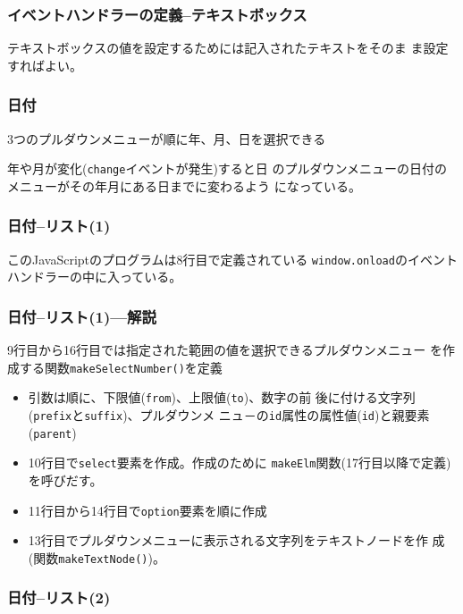 \begin{frame}[containsverbatim]
 \frametitle{イベントハンドラーの定義--テキストボックス}
 テキストボックスの値を設定するためには記入されたテキストをそのま
       ま設定すればよい。
\end{frame}
\begin{frame}[containsverbatim]
\frametitle{日付}
3つのプルダウンメニューが順に年、月、日を選択できる

年や月が変化(\texttt{change}イベントが発生)すると日
 のプルダウンメニューの日付のメニューがその年月にある日までに変わるよう
 になっている。
\end{frame}
\begin{frame}[containsverbatim]
\frametitle{日付--リスト(1)}
 このJavaScriptのプログラムは8行目で定義されている
       \texttt{window.onload}のイベントハンドラーの中に入っている。

\end{frame}
\begin{frame}[containsverbatim]
\frametitle{日付--リスト(1)---解説}
 9行目から16行目では指定された範囲の値を選択できるプルダウンメニュー
       を作成する関数\texttt{makeSelectNumber()}を定義
\begin{itemize}
 \item 引数は順に、下限値(\texttt{from})、上限値(\texttt{to})、数字の前
       後に付ける文字列(\texttt{prefix}と\texttt{suffix})、プルダウンメ
       ニュ－の\texttt{id}属性の属性値(\texttt{id})と親要素
       (\texttt{parent})
 \item 10行目で\texttt{select}要素を作成。作成のために
       \texttt{makeElm}関数(17行目以降で定義)を呼びだす。
 \item 11行目から14行目で\texttt{option}要素を順に作成
 \item 13行目でプルダウンメニューに表示される文字列をテキストノードを作
       成(関数\texttt{makeTextNode()})。
\end{itemize}
\end{frame}
\begin{frame}[containsverbatim]
\frametitle{日付--リスト(2)}
\end{frame}
